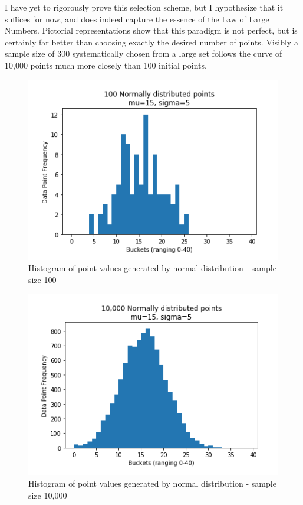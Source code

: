 I have yet to rigorously prove this selection scheme, but I hypothesize that it suffices for now, and does indeed capture the essence of the Law of Large Numbers. Pictorial representations show that this paradigm is not perfect, but is certainly far better than choosing exactly the desired number of points. Visibly a sample size of 300 systematically chosen from a large set follows the curve of 10,000 points much more closely than 100 initial points.

\begin{figure}[H]
\centering
\includegraphics[scale=0.7]{law1.png}
\caption{Histogram of point values generated by normal distribution - sample size 100}
\label{fig:law1}
\end{figure}

\begin{figure}[H]
\centering
\includegraphics[scale=0.7]{law2.png}
\caption{Histogram of point values generated by normal distribution - sample size 10,000}
\label{fig:law2}
\end{figure}

